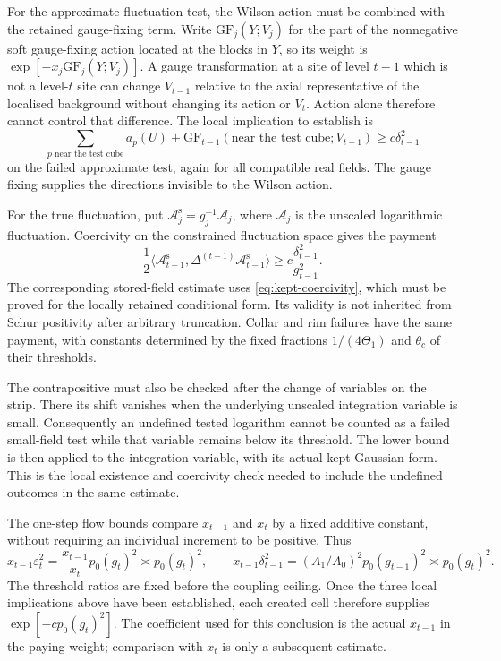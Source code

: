 \documentclass[11pt,letterpaper,reqno]{amsart}
\theoremstyle{definition}
\theoremstyle{remark}
\begin{document}
For the approximate fluctuation test, the Wilson action must be
combined with the retained gauge-fixing term. Write
$\mathrm{GF}_j(Y;V_j)$ for the part of the nonnegative soft
gauge-fixing action located at the blocks in $Y$, so its weight
is $\exp[-x_j\mathrm{GF}_j(Y;V_j)]$. A gauge transformation
at a site of level $t-1$ which is not a level-$t$ site can change
$V_{t-1}$ relative to the axial representative of the localised
background without changing its action or $V_t$. Action alone
therefore cannot control that difference. The local implication
to establish is
\[
 \sum_{p\text{ near the test cube}}a_p(U)
       +\mathrm{GF}_{t-1}(\text{near the test cube};V_{t-1})
                            \ge c\delta_{t-1}^2
\]
on the failed approximate test, again for all compatible real
fields. The gauge fixing supplies the directions invisible to
the Wilson action.

For the true fluctuation, put
$\mathcal A_j^{\mathrm s}=g_j^{-1}\mathcal A_j$, where
$\mathcal A_j$ is the unscaled logarithmic fluctuation. Coercivity
on the constrained fluctuation space gives the payment
\begin{equation}\label{eq:failed-fluctuation-payment}
 \frac12\langle\mathcal A_{t-1}^{\mathrm s},
                 \Delta^{(t-1)}\mathcal A_{t-1}^{\mathrm s}\rangle
                     \ge c\frac{\delta_{t-1}^2}{g_{t-1}^2}.
\end{equation}
The corresponding stored-field estimate uses
\eqref{eq:kept-coercivity}, which must be proved for the
locally retained conditional form. Its validity is not inherited
from Schur positivity after arbitrary truncation. Collar and rim
failures have the same payment, with constants determined by the
fixed fractions $1/(4\Theta_1)$ and $\theta_c$ of their thresholds.

The contrapositive must also be checked after the change of
variables on the strip. There its shift vanishes when the
underlying unscaled integration variable is small. Consequently
an undefined tested logarithm cannot be counted as a failed
small-field test while that variable remains below its threshold.
The lower bound is then applied to the integration variable,
with its actual kept Gaussian form. This is the local existence
and coercivity check needed to include the undefined outcomes
in the same estimate.

The one-step flow bounds compare $x_{t-1}$ and $x_t$ by a fixed
additive constant, without requiring an individual increment to
be positive. Thus
\[
 x_{t-1}\varepsilon_t^2
       =\frac{x_{t-1}}{x_t}p_0(g_t)^2
       \asymp p_0(g_t)^2,
 \qquad
 x_{t-1}\delta_{t-1}^2
       =(A_1/A_0)^2p_0(g_{t-1})^2
       \asymp p_0(g_t)^2.
\]
The threshold ratios are fixed before the coupling ceiling.
Once the three local implications above have been established,
each created cell therefore supplies
$\exp[-cp_0(g_t)^2]$. The coefficient used for this conclusion
is the actual $x_{t-1}$ in the paying weight; comparison with
$x_t$ is only a subsequent estimate.
\end{document}
